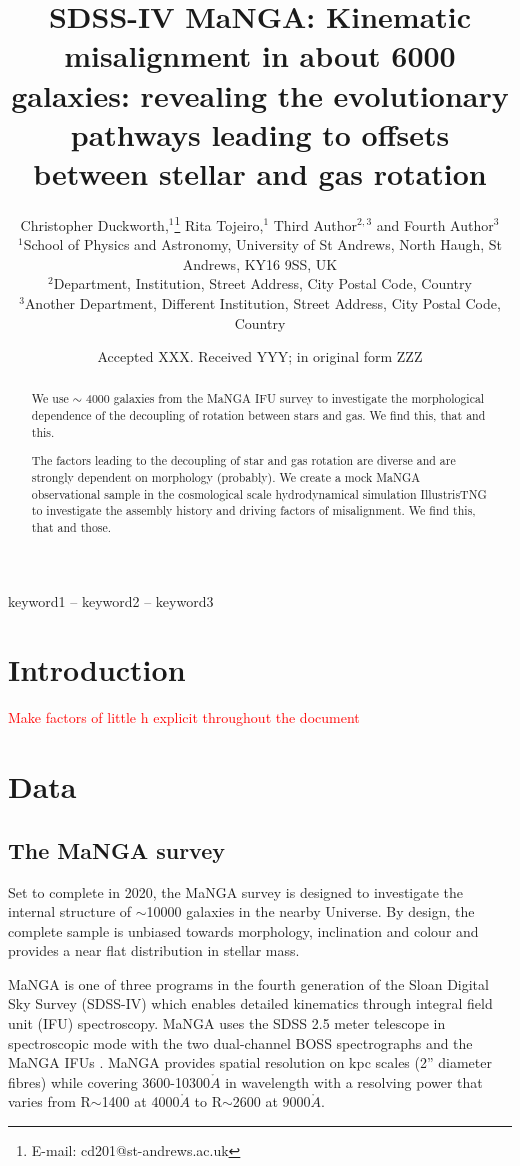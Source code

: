 \documentclass[fleqn,usenatbib]{mnras}
\title[Origin of kinematic misalignment]{SDSS-IV MaNGA: Kinematic misalignment in about 6000 galaxies: revealing the evolutionary pathways leading to offsets between stellar and gas rotation}
\author[C. Duckworth et al.]{Christopher Duckworth,$^{1}$\thanks{E-mail: cd201@st-andrews.ac.uk}
Rita Tojeiro,$^{1}$
Third Author$^{2,3}$
and Fourth Author$^{3}$
\\
{}$^{1}$School of Physics and Astronomy, University of St Andrews, North Haugh, St Andrews, KY16 9SS, UK\\
$^{2}$Department, Institution, Street Address, City Postal Code, Country\\
$^{3}$Another Department, Different Institution, Street Address, City Postal Code, Country
}
\date{Accepted XXX. Received YYY; in original form ZZZ}
\newcommand{\red}[1]{{\textcolor{red}{#1}}}
\begin{document}
\label{firstpage}
\pagerange{\pageref{firstpage}--\pageref{lastpage}}
\maketitle

\begin{abstract}
We use $\sim$ 4000 galaxies from the MaNGA IFU survey to investigate the morphological dependence of the decoupling of rotation between stars and gas. We find this, that and this.

The factors leading to the decoupling of star and gas rotation are diverse and are strongly dependent on morphology (probably). We create a mock MaNGA observational sample in the cosmological scale hydrodynamical simulation IllustrisTNG to investigate the assembly history and driving factors of misalignment. We find this, that and those.

\end{abstract}

\begin{keywords}
keyword1 -- keyword2 -- keyword3
\end{keywords}
\section{Introduction}
\red{Make factors of little h explicit throughout the document}
\section{Data}
\subsection{The MaNGA survey}
Set to complete in 2020, the MaNGA survey is designed to investigate the internal structure of $\sim$10000 galaxies in the nearby Universe. By design, the complete sample is unbiased towards morphology, inclination and colour and provides a near flat distribution in stellar mass. 

MaNGA is one of three programs in the fourth generation of the Sloan Digital Sky Survey (SDSS-IV) which enables detailed kinematics through integral field unit (IFU) spectroscopy. MaNGA uses the SDSS 2.5 meter telescope in spectroscopic mode \citep{gunn2006} with the two dual-channel BOSS spectrographs \citep{smee2013} and the MaNGA IFUs \citep{drory2015}. MaNGA provides spatial resolution on kpc scales (2'' diameter fibres) while covering 3600-10300$\mathring{A}$ in wavelength with a resolving power that varies from R$\sim$1400 at 4000$\mathring{A}$ to R$\sim$2600 at 9000$\mathring{A}$. 
\end{document}
